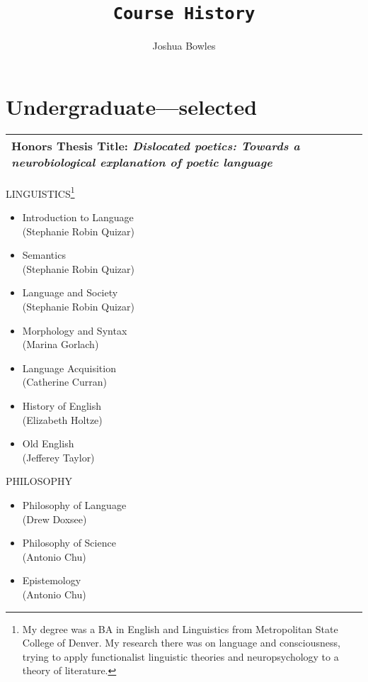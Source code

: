 \documentclass[11pt,twosided]{article}
\theoremstyle{plain}
\theoremstyle{definition}
\newtheorem{phrase string}{Phrase String}
\begin{document}
 
\title{\texttt{Course History}}

\author{Joshua Bowles}
\maketitle



\section{Undergraduate---selected}

\begin{tabular}{|p{12cm}|}
\hline
\textbf{Honors Thesis Title:} \textsl{Dislocated poetics: Towards a neurobiological explanation of poetic language}\\
\hline 
\end{tabular}
\newline
\newline

\noindent LINGUISTICS\footnote{My degree was a BA in English and Linguistics from Metropolitan State College of Denver. My research there was on language and consciousness, trying to apply functionalist linguistic theories and neuropsychology to a theory of literature.}
\begin{itemize}
\item Introduction to Language\\
(Stephanie Robin Quizar)
\item Semantics\\
(Stephanie Robin Quizar)
\item Language and Society\\
(Stephanie Robin Quizar)
\item Morphology and Syntax\\
(Marina Gorlach)
\item Language Acquisition\\
(Catherine Curran)
\item History of English\\
(Elizabeth Holtze)
\item Old English\\
(Jefferey Taylor)
\end{itemize}

\noindent PHILOSOPHY
\begin{itemize}
\item Philosophy of Language\\
(Drew Doxsee)
\item Philosophy of Science\\
(Antonio Chu)
\item Epistemology\\
(Antonio Chu)
\end{itemize}
\end{document}

